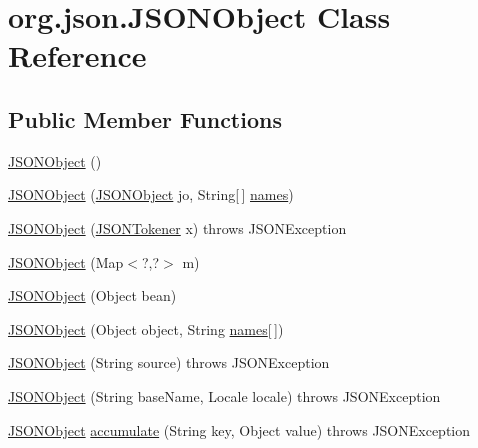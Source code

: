 \hypertarget{classorg_1_1json_1_1JSONObject}{\section{org.\-json.\-J\-S\-O\-N\-Object Class Reference}
\label{classorg_1_1json_1_1JSONObject}
}
\subsection*{Public Member Functions}
\begin{DoxyCompactItemize}
\item 
\hyperlink{classorg_1_1json_1_1JSONObject_a7c17e59daff74ce50c6677c6f5da233d}{J\-S\-O\-N\-Object} ()
\item 
\hyperlink{classorg_1_1json_1_1JSONObject_a0e61a2a56e4a34ac5c8730497c320fe9}{J\-S\-O\-N\-Object} (\hyperlink{classorg_1_1json_1_1JSONObject}{J\-S\-O\-N\-Object} jo, String\mbox{[}$\,$\mbox{]} \hyperlink{classorg_1_1json_1_1JSONObject_a02e83de70e290231527d1760c4dd30fc}{names})
\item 
\hyperlink{classorg_1_1json_1_1JSONObject_a30954f996711f48cb2dc9b456824e02e}{J\-S\-O\-N\-Object} (\hyperlink{classorg_1_1json_1_1JSONTokener}{J\-S\-O\-N\-Tokener} x)  throws J\-S\-O\-N\-Exception 
\item 
\hyperlink{classorg_1_1json_1_1JSONObject_a424ab17cdb94e2a79165bf852bee570c}{J\-S\-O\-N\-Object} (Map$<$?,?$>$ m)
\item 
\hyperlink{classorg_1_1json_1_1JSONObject_adf96cd2952efa10c86156b9c8f4fe9b1}{J\-S\-O\-N\-Object} (Object bean)
\item 
\hyperlink{classorg_1_1json_1_1JSONObject_af3f343eaf2cca8718a55d0f105807f9b}{J\-S\-O\-N\-Object} (Object object, String \hyperlink{classorg_1_1json_1_1JSONObject_a02e83de70e290231527d1760c4dd30fc}{names}\mbox{[}$\,$\mbox{]})
\item 
\hyperlink{classorg_1_1json_1_1JSONObject_a015b17aea42a3c1762b66cd1c0803d04}{J\-S\-O\-N\-Object} (String source)  throws J\-S\-O\-N\-Exception 
\item 
\hyperlink{classorg_1_1json_1_1JSONObject_a8c9f78e54c6e38ecb786fee7163e26fa}{J\-S\-O\-N\-Object} (String base\-Name, Locale locale)  throws J\-S\-O\-N\-Exception 
\item 
\hyperlink{classorg_1_1json_1_1JSONObject}{J\-S\-O\-N\-Object} \hyperlink{classorg_1_1json_1_1JSONObject_a2c8b90ffd10c970175d63daf3e682634}{accumulate} (String key, Object value)  throws J\-S\-O\-N\-Exception 

\end{DoxyCompactItemize}
